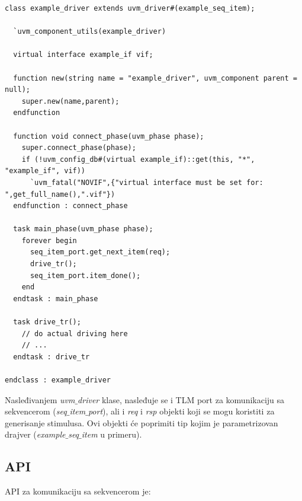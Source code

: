 \begin{lstlisting}
class example_driver extends uvm_driver#(example_seq_item);

  `uvm_component_utils(example_driver)

  virtual interface example_if vif;

  function new(string name = "example_driver", uvm_component parent = null);
    super.new(name,parent);
  endfunction

  function void connect_phase(uvm_phase phase);
    super.connect_phase(phase);
    if (!uvm_config_db#(virtual example_if)::get(this, "*", "example_if", vif))
      `uvm_fatal("NOVIF",{"virtual interface must be set for: ",get_full_name(),".vif"})
  endfunction : connect_phase

  task main_phase(uvm_phase phase);
    forever begin
      seq_item_port.get_next_item(req);
      drive_tr();
      seq_item_port.item_done();
    end
  endtask : main_phase

  task drive_tr();
    // do actual driving here
    // ...
  endtask : drive_tr

endclass : example_driver
\end{lstlisting}

Nasleđivanjem \emph{uvm\(\_\)driver} klase, nasleđuje se i TLM port za
komunikaciju sa sekvencerom (\emph{seq\(\_\)item\(\_\)port}), ali i \emph{req} i
\emph{rsp} objekti koji se mogu koristiti za generisanje stimulusa. Ovi objekti
će poprimiti tip kojim je parametrizovan drajver (\emph{example\(\_\)seq\(\_\)item} u
primeru).


\subsection{API}

API za komunikaciju sa sekvencerom je:

